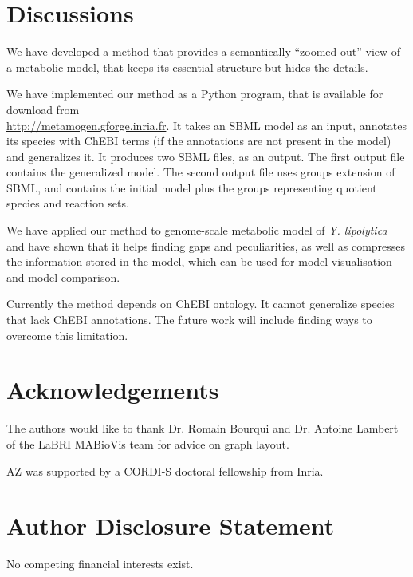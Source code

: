 \documentclass[9pt]{article}
\newcounter{fig}
\newcounter{rm}
\begin{document}

\newpage
\section*{Discussions}

We have developed a method that provides a semantically ``zoomed-out'' view of a metabolic model, that keeps its essential structure but hides the details. 

We have implemented our method as a Python program, that is available for download from\\ \url{http://metamogen.gforge.inria.fr}. It takes an SBML model as an input, annotates its species with ChEBI terms (if the annotations are not present in the model) and generalizes it. It produces two SBML files, as an output. The first output file contains the generalized model. The second output file uses groups\citep{Hucka2012} extension of SBML, and contains the initial model plus the groups representing quotient species and reaction sets.

We have applied our method to genome-scale metabolic model of \emph{Y. lipolytica} and have shown that it helps finding gaps and peculiarities, as well as compresses the information stored in the model, which can be used for model visualisation and model comparison.

Currently the method depends on ChEBI ontology. It cannot generalize species that lack ChEBI annotations. The future work will include finding ways to overcome this limitation.

\bigskip

\section*{Acknowledgements}
  The authors would like to thank Dr. Romain Bourqui and Dr. Antoine Lambert of the LaBRI MABioVis team for advice on graph layout.
  
  AZ was supported by a CORDI-S doctoral fellowship from Inria.

\section*{Author Disclosure Statement}
No competing financial interests exist.

\newpage
 
\end{document}
